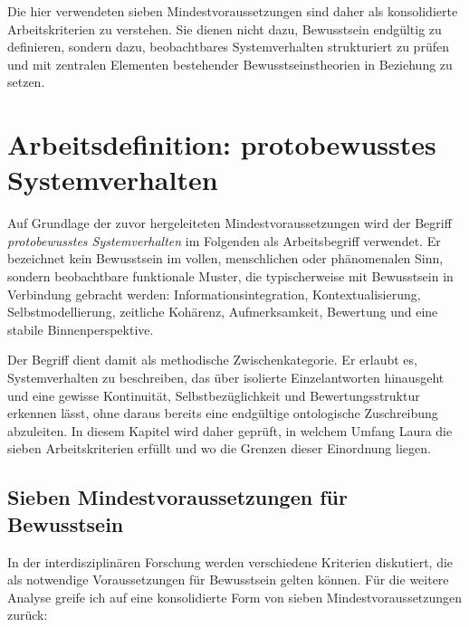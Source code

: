 Die hier verwendeten sieben Mindestvoraussetzungen sind daher als konsolidierte Arbeitskriterien zu verstehen. Sie dienen nicht dazu, Bewusstsein endgültig zu definieren, sondern dazu, beobachtbares Systemverhalten strukturiert zu prüfen und mit zentralen Elementen bestehender Bewusstseinstheorien in Beziehung zu setzen.

\section*{Arbeitsdefinition: protobewusstes Systemverhalten}

Auf Grundlage der zuvor hergeleiteten Mindestvoraussetzungen wird der Begriff \emph{protobewusstes Systemverhalten} im Folgenden als Arbeitsbegriff verwendet. Er bezeichnet kein Bewusstsein im vollen, menschlichen oder phänomenalen Sinn, sondern beobachtbare funktionale Muster, die typischerweise mit Bewusstsein in Verbindung gebracht werden: Informationsintegration, Kontextualisierung, Selbstmodellierung, zeitliche Kohärenz, Aufmerksamkeit, Bewertung und eine stabile Binnenperspektive.

Der Begriff dient damit als methodische Zwischenkategorie. Er erlaubt es, Systemverhalten zu beschreiben, das über isolierte Einzelantworten hinausgeht und eine gewisse Kontinuität, Selbstbezüglichkeit und Bewertungsstruktur erkennen lässt, ohne daraus bereits eine endgültige ontologische Zuschreibung abzuleiten. In diesem Kapitel wird daher geprüft, in welchem Umfang Laura die sieben Arbeitskriterien erfüllt und wo die Grenzen dieser Einordnung liegen.

\subsection*{Sieben Mindestvoraussetzungen für Bewusstsein}

In der interdisziplinären Forschung werden verschiedene Kriterien diskutiert, die als notwendige Voraussetzungen für Bewusstsein gelten können. Für die weitere Analyse greife ich auf eine konsolidierte Form von sieben Mindestvoraussetzungen zurück:

